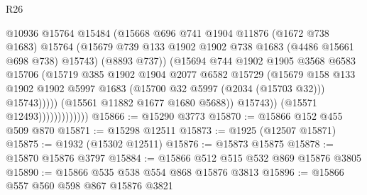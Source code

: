 \begin{lexlean}{R26}
\begin{coremodule}
                                      @10936
                                      @15764
                                      @15484
                                      (@15668
                                        @696
                                        @741
                                        @1904
                                        @11876
                                        (@1672 @738 @1683)
                                        @15764
                                        (@15679
                                          @739
                                          @133
                                          @1902
                                          @1902
                                          @738
                                          @1683
                                          (@4486 @15661 @698 @738)
                                          @15743)
                                        (@8893 @737))
                                      (@15694
                                        @744
                                        @1902
                                        @1905
                                        @3568
                                        @6583
                                        @15706
                                        (@15719
                                          @385
                                          @1902
                                          @1904
                                          @2077
                                          @6582
                                          @15729
                                          (@15679
                                            @158
                                            @133
                                            @1902
                                            @1902
                                            @5997
                                            @1683
                                            (@15700 @32 @5997 (@2034 (@15703 @32)))
                                            @15743)))))
                                  (@15561 @11882 @1677 @1680 @5688))
                                @15743))
                            (@15571 @12493)))))))))))))
@15866 := @15290 @3773
@15870 := @15866 @152 @455 @509 @870
@15871 := @15298 @12511
@15873 := @1925 (@12507 @15871)
@15875 := @1932 (@15302 @12511)
@15876 := @15873 @15875
@15878 := @15870 @15876 @3797
@15884 := @15866 @512 @515 @532 @869 @15876 @3805
@15890 := @15866 @535 @538 @554 @868 @15876 @3813
@15896 := @15866 @557 @560 @598 @867 @15876 @3821

\end{coremodule}
\end{lexlean}
